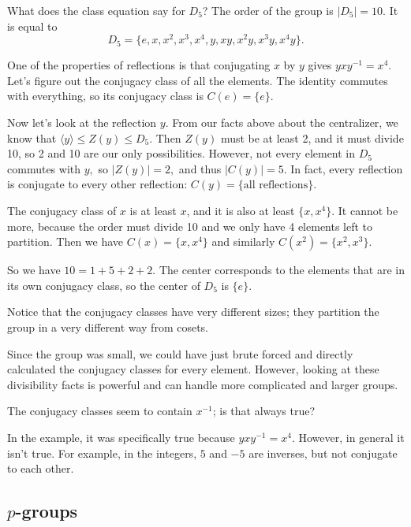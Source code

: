 \begin{example}
What does the class equation say for $D_5$? The order of the group is $|D_5| = 10.$ It is equal to 
\[
D_5 = \{e, x, x^2, x^3, x^4, y, xy, x^2y, x^3y, x^4y\}.
\]

One of the properties of reflections is that conjugating $x$ by $y$ gives $yxy^{-1} = x^4.$
Let's figure out the conjugacy class of all the elements. 
The identity commutes with everything, so its conjugacy class is $C(e) = \{e\}.$ 

Now let's look at the reflection $y$.
From our facts above about the centralizer, we know that $\langle y \rangle \leq Z(y) \leq D_5.$ Then $Z(y)$ must be at least 2, and it must divide 10, so 2 and 10 are our only possibilities. 
However, not every element in $D_5$ commutes with $y,$ so $|Z(y)| = 2,$ and thus $|C(y)| = 5.$ In fact, every reflection is conjugate to every other reflection: $C(y) = \{\text{all reflections}\}.$ 

The conjugacy class of $x$ is at least $x$, and it is also at least $\{x, x^4\}.$ It cannot be more, because the order must divide 10 and we only have 4 elements left to partition. Then we have $C(x) = \{x, x^4\}$ and similarly $C(x^2) = \{x^2, x^3\}.$

So we have $10 = 1 + 5 + 2 + 2.$ 
The center corresponds to the elements that are in its own conjugacy class, so the center of $D_5$ is $\{e\}.$
\end{example}
Notice that the conjugacy classes have very different sizes; they partition the group in a very different way from cosets.

Since the group was small, we could have just brute forced and directly calculated the conjugacy classes for every element. However, looking at these divisibility facts is powerful and can handle more complicated and larger groups.
\begin{question}
The conjugacy classes seem to contain $x^{-1}$; is that always true?
\end{question}
\begin{ans}
In the example, it was specifically true because $yxy^{-1} = x^4$.
However, in general it isn't true.
For example, in the integers, $5$ and $-5$ are inverses, but not conjugate to each other.
\end{ans}
\subsection{\texorpdfstring{$p$}{p}-groups}

